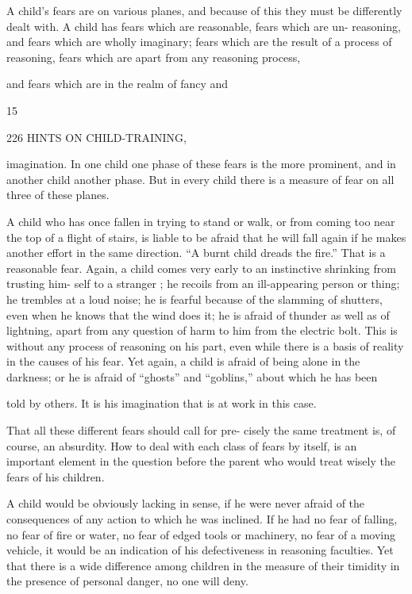 \documentclass[
]{book}
\begin{document}
A child's fears are on various planes, and because of this they must be differently dealt with. A child has fears which are reasonable, fears which are un- reasoning, and fears which are wholly imaginary; fears which are the result of a process of reasoning, fears which are apart from any reasoning process,

and fears which are in the realm of fancy and

15

226 HINTS ON CHILD-TRAINING,

imagination. In one child one phase of these fears is the more prominent, and in another child another phase. But in every child there is a measure of fear on all three of these planes.

A child who has once fallen in trying to stand or walk, or from coming too near the top of a flight of stairs, is liable to be afraid that he will fall again if he makes another effort in the same direction. ``A burnt child dreads the fire.'' That is a reasonable fear. Again, a child comes very early to an instinctive shrinking from trusting him- self to a stranger ; he recoils from an ill-appearing person or thing; he trembles at a loud noise; he is fearful because of the slamming of shutters, even when he knows that the wind does it; he is afraid of thunder as well as of lightning, apart from any question of harm to him from the electric bolt. This is without any process of reasoning on his part, even while there is a basis of reality in the causes of his fear. Yet again, a child is afraid of being alone in the darkness; or he is afraid of ``ghosts'' and ``goblins,'' about which he has been

told by others. It is his imagination that is at work in this case.

That all these different fears should call for pre- cisely the same treatment is, of course, an absurdity. How to deal with each class of fears by itself, is an important element in the question before the parent who would treat wisely the fears of his children.

A child would be obviously lacking in sense, if he were never afraid of the consequences of any action to which he was inclined. If he had no fear of falling, no fear of fire or water, no fear of edged tools or machinery, no fear of a moving vehicle, it would be an indication of his defectiveness in reasoning faculties. Yet that there is a wide difference among children in the measure of their timidity in the presence of personal danger, no one will deny.
\end{document}
